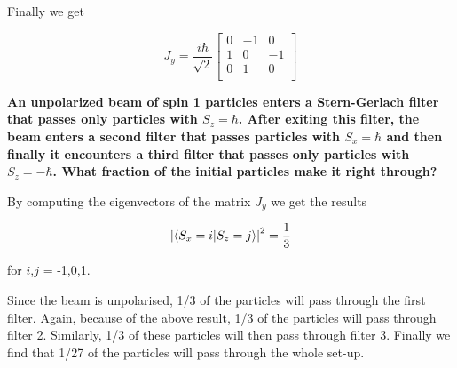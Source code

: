 \begin{alphaparts}
Finally we get

\begin{equation}
    J_y = 
    \frac{i \hbar}{\sqrt{2}}
    \begin{bmatrix}
    0 & -1 & 0 \\
    1 & 0 & -1 \\
    0 & 1 & 0 \\
    \end{bmatrix}
\end{equation}

\questionpart 
\textbf{An unpolarized beam of spin 1 particles enters a Stern-Gerlach filter
that passes only particles with $S_z = \hbar$. After exiting this filter, the beam 
enters a second filter that passes particles with $S_x = \hbar$ and then finally it 
encounters a third filter that passes only particles with $S_z = -\hbar$.  
What fraction of the initial particles make it right through?}

By computing the eigenvectors of the matrix $J_y$ we get the results

\begin{equation}
    \abs{\braket{S_x = i}{S_z = j}}^2 = \frac{1}{3}
\end{equation}

for $i$,$j$ = -1,0,1.

Since the beam is unpolarised, 1/3 of the particles will pass through the first filter. Again, because of the above result, 1/3 of the particles will pass through filter 2. Similarly, 1/3 of these particles will then pass through filter 3. Finally we find that 1/27 of the particles will pass through the whole set-up. 



\end{alphaparts}
